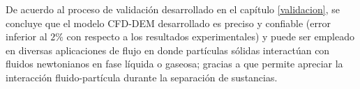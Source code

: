 \noindent
\justify

De acuerdo al proceso de validaci\'on desarrollado en el cap\'itulo \ref{validacion}, se concluye que el modelo CFD-DEM desarrollado es preciso y confiable (error inferior al $2\%$ con respecto a los resultados experimentales) y puede ser empleado en diversas aplicaciones de flujo en donde part\'iculas s\'olidas interact\'uan con fluidos newtonianos en fase l\'iquida o gaseosa; gracias a que permite apreciar la interacci\'on fluido-part\'icula durante la separaci\'on de sustancias.
